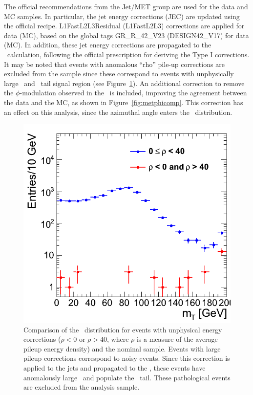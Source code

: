 The official recommendations from the Jet/MET group are used for 
the data and MC samples. In particular, the jet
energy corrections (JEC) are updated using the official recipe.
L1FastL2L3Residual (L1FastL2L3) corrections are applied for data (MC),
based on the global tags GR\_R\_42\_V23 (DESIGN42\_V17) for
data (MC). In addition, these jet energy corrections are propagated to
the \met\ calculation, following the official prescription for
deriving the Type I corrections. It may be noted that events with
anomalous ``rho'' pile-up corrections are excluded from the sample since these 
correspond to events with unphysically large \met\ and \mt\ tail
signal region (see Figure~\ref{fig:mtrhocomp}). An additional correction to remove
the $\phi$-modulation observed in the \met\ is included, improving 
the agreement between the data and the MC, as shown in 
Figure~\ref{fig:metphicomp}. This correction has an effect on this analysis,
since the azimuthal angle enters the \mt\ distribution. 

\clearpage

\begin{figure}[!ht]
  \begin{center}
	\includegraphics[width=0.5\linewidth]{plots/mt_rho_comp.png}
	\caption{ \label{fig:mtrhocomp}%
	  Comparison of the \mt\ distribution for events with
          unphysical energy corrections ($\rho <0$ or $ \rho > 40$, where $\rho$ is a
          measure of the average pileup energy density) and the
          nominal sample. Events with large pileup corrections 
          correspond to noisy events. Since this correction is applied
          to the jets and propagated to the \met, these events have
          anomalously large \met\ and populate the \mt\ tail. These
          pathological events are excluded from the analysis sample.}
  \end{center}
\end{figure}

